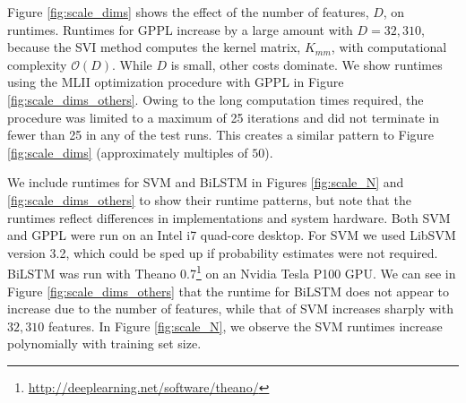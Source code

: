Figure \ref{fig:scale_dims} shows the effect of the number of features, $D$, on runtimes.  
Runtimes for GPPL increase by a large amount with $D=32,310$,
 because the SVI method computes the kernel matrix, $K_{mm}$, with computational complexity $\mathcal{O}(D)$. 
 While $D$ is small, other costs dominate. 
We show runtimes using the MLII optimization procedure with GPPL in Figure \ref{fig:scale_dims_others}. 
Owing to the long computation times required, the procedure was limited to
a maximum of 25 iterations and did not terminate in fewer than 25 in any of the test runs. 
This creates a similar pattern to Figure \ref{fig:scale_dims} (approximately multiples of $50$).

We include runtimes for SVM and BiLSTM in Figures \ref{fig:scale_N} and
\ref{fig:scale_dims_others} to show their runtime patterns, but note that the runtimes reflect differences in implementations and system hardware.
Both SVM and GPPL were run on an Intel i7 quad-core desktop. For SVM we used LibSVM version 3.2, which could be sped up if probability estimates were not required.
BiLSTM was run with Theano 0.7\footnote{\url{http://deeplearning.net/software/theano/}} on an Nvidia Tesla P100 GPU. 
We can see in Figure \ref{fig:scale_dims_others} that the runtime for BiLSTM does
not appear to increase due to the number of features, while that of SVM increases sharply with $32,310$ features. 
In Figure \ref{fig:scale_N}, we observe the SVM runtimes increase polynomially with training set size. 

